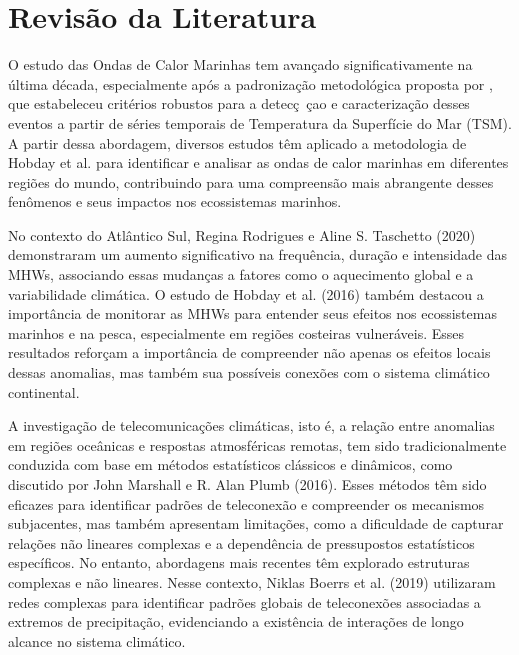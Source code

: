 \chapter{Revisão da Literatura}
\label{cap:fundamentacao-teorica}

O estudo das Ondas de Calor Marinhas tem avançado significativamente na última década,
especialmente após a padronização metodológica proposta por , que estabeleceu
critérios robustos para a detecç~çao e caracterização desses eventos a partir de séries temporais de Temperatura da Superfície do Mar (TSM).
A partir dessa abordagem, diversos estudos têm aplicado a metodologia de Hobday et al. para identificar e analisar as ondas de calor marinhas em diferentes regiões do mundo, 
contribuindo para uma compreensão mais abrangente desses fenômenos e seus impactos nos ecossistemas marinhos. 

No contexto do Atlântico Sul, Regina Rodrigues e Aline S. Taschetto (2020) demonstraram um aumento significativo na frequência, duração e intensidade das MHWs, associando
essas mudanças a fatores como o aquecimento global e a variabilidade climática. O estudo de Hobday et al. (2016) também destacou a importância de monitorar as MHWs para entender seus efeitos nos ecossistemas marinhos e na pesca, especialmente em regiões costeiras vulneráveis.
Esses resultados reforçam a importância de compreender não apenas os efeitos locais dessas anomalias, mas também sua possíveis conexões com o sistema climático continental.

A investigação de telecomunicações climáticas, isto é, a relação entre anomalias em regiões oceânicas e respostas atmosféricas remotas, tem sido tradicionalmente conduzida com base em métodos estatísticos clássicos e dinâmicos,
como discutido por John Marshall e R. Alan Plumb (2016). Esses métodos têm sido eficazes para identificar padrões de teleconexão e compreender os mecanismos subjacentes, mas também apresentam limitações, como a dificuldade de capturar relações não lineares complexas e a dependência de pressupostos estatísticos específicos.
No entanto, abordagens mais recentes têm explorado estruturas complexas e não lineares. Nesse contexto, Niklas Boerrs et al. (2019) utilizaram redes complexas para identificar padrões globais de teleconexões associadas a extremos de precipitação, evidenciando a existência de interações de longo alcance no sistema climático.

